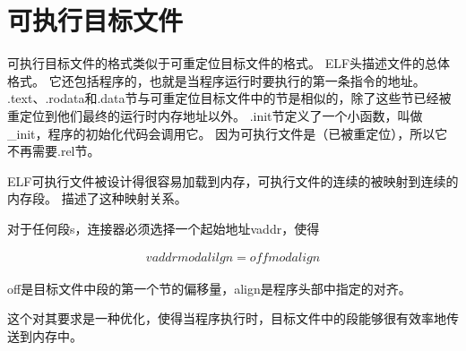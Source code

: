 
\section{可执行目标文件}
{
    可执行目标文件的格式类似于可重定位目标文件的格式。
    ELF头描述文件的总体格式。
    它还包括程序的，也就是当程序运行时要执行的第一条指令的地址。
    .text、.rodata和.data节与可重定位目标文件中的节是相似的，除了这些节已经被重定位到他们最终的运行时内存地址以外。
    .init节定义了一个小函数，叫做_init，程序的初始化代码会调用它。
    因为可执行文件是（已被重定位），所以它不再需要.rel节。

    ELF可执行文件被设计得很容易加载到内存，可执行文件的连续的被映射到连续的内存段。
    描述了这种映射关系。

    对于任何段s，连接器必须选择一个起始地址vaddr，使得

    \begin{align*}
        vaddr mod alilgn = off mod align
    \end{align*}

    off是目标文件中段的第一个节的偏移量，align是程序头部中指定的对齐。

    这个对其要求是一种优化，使得当程序执行时，目标文件中的段能够很有效率地传送到内存中。
}
